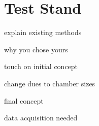 \section{Test Stand}

explain existing methods

why you chose yours

touch on initial concept

change dues to chamber sizes

final concept

data acquisition needed